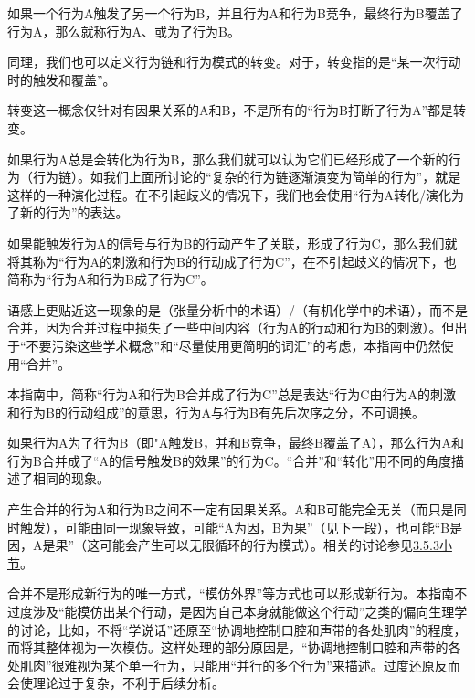
如果一个行为A触发了另一个行为B，并且行为A和行为B竞争，最终行为B覆盖了行为A，那么就称行为A、或为了行为B。
\begin{explain}
同理，我们也可以定义行为链和行为模式的转变。对于\rigorous，转变指的是“某一次行动时的触发和覆盖”。

转变这一概念仅针对有因果关系的A和B，不是所有的“行为B打断了行为A”都是转变。

如果行为A总是会转化为行为B，那么我们就可以认为它们已经形成了一个新的行为（行为链）。如我们上面所讨论的“复杂的行为链逐渐演变为简单的行为”，就是这样的一种演化过程。在不引起歧义的情况下，我们也会使用“行为A转化/演化为了新的行为”的表达。
\end{explain}
如果能触发行为A的信号与行为B的行动产生了关联，形成了行为C，那么我们就将其称为“行为A的刺激和行为B的行动成了行为C”，在不引起歧义的情况下，也简称为“行为A和行为B成了行为C”。
\begin{examples}
语感上更贴近这一现象的是（张量分析中的术语）/（有机化学中的术语），而不是合并，因为合并过程中损失了一些中间内容（行为A的行动和行为B的刺激）。但出于“不要污染这些学术概念”和“尽量使用更简明的词汇”的考虑，本指南中仍然使用“合并”。

本指南中，简称“行为A和行为B合并成了行为C”总是表达“行为C由行为A的刺激和行为B的行动组成”的意思，行为A与行为B有先后次序之分，不可调换。

如果行为A为了行为B（即"A触发B，并和B竞争，最终B覆盖了A），那么行为A和行为B合并成了“A的信号触发B的效果”的行为C。“合并”和“转化”用不同的角度描述了相同的现象。

产生合并的行为A和行为B之间不一定有因果关系。A和B可能完全无关（而只是同时触发），可能由同一现象导致，可能“A为因，B为果”（见下一段），也可能“B是因，A是果”（这可能会产生可以无限循环的行为模式）。相关的讨论参见\hyperref[sec:内容顺序与触发顺序]{3.5.3小节}。

合并不是形成新行为的唯一方式，“模仿外界”等方式也可以形成新行为。本指南不过度涉及“能模仿出某个行动，是因为自己本身就能做这个行动”之类的偏向生理学的讨论，比如，不将“学说话”还原至“协调地控制口腔和声带的各处肌肉”的程度，而将其整体视为一次模仿。这样处理的部分原因是，“协调地控制口腔和声带的各处肌肉”很难视为某个单一行为，只能用“并行的多个行为”来描述。过度还原反而会使理论过于复杂，不利于后续分析。
\end{examples}
